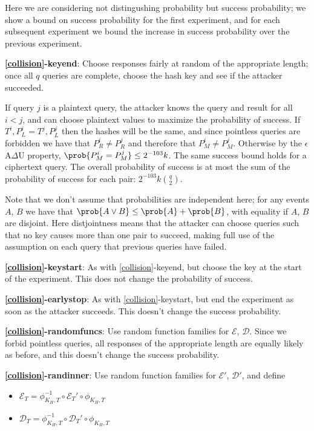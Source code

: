 \documentclass[letterpaper,luatex,11pt]{article}
\newcommand*{\xprm}[2]{\textsf{\ref*{#1}-#2}}
\newcommand*{\xprmtitle}[2]{\textbf{\xprm{#1}{#2}}}
\newcommand*{\calE}{\mathcal{E}}
\newcommand*{\calD}{\mathcal{D}}
\begin{document}
Here we are considering not distingushing probability but success probability; we
show a bound on success probability for the first experiment, and for each subsequent experiment
we bound the increase in success probability over the previous experiment.

\xprmtitle{collision}{keyend}: Choose responses fairly at random of the appropriate length;
once all $q$ queries are complete, choose the hash key and see if the attacker succeeded.

If query $j$ is a plaintext query, the attacker knows the query and result
for all $i < j$, and can choose plaintext values to maximize the probability of success.
If $T^i, P_L^i = T^j, P_L^j$ then the hashes will be the same, and since pointless
queries are forbidden we have that $P_R^i \neq P_R^j$ and therefore that
$P_M^i \neq P_M^j$. Otherwise by the $\epsilon$A$\Delta$U property,
$\prob{P_M^i = P_M^j} \leq 2^{-103}k$. The same success bound holds for a ciphertext query.
The overall probability of success
is at most the sum of the probability of success for each pair:
$2^{-103}k\binom{q}{2}$.

Note that we don't assume that probabilities are independent here;
for any events $A$, $B$ we have that $\prob{A \vee B} \leq \prob{A} + \prob{B}$, with
equality if $A$, $B$ are disjoint. Here distjointness means that the attacker can
choose queries such that no key causes more than one pair to succeed, making full use of
the assumption on each query that previous queries have failed.

\xprmtitle{collision}{keystart}: As with \xprm{collision}{keyend}, but
choose the key at the start of the experiment. This
does not change the probability of success.

\xprmtitle{collision}{earlystop}: As with \xprm{collision}{keystart}, but
end the experiment as soon as the attacker succeeds.
This doesn't change the success probability.

\xprmtitle{collision}{randomfuncs}: Use random function families for $\calE$,
$\calD$. Since we forbid pointless queries,
all responses of the appropriate length are equally likely as before,
and this doesn't change the success probability.

\xprmtitle{collision}{randinner}: Use random function families for $\calE'$, $\calD'$, and define
\begin{itemize}
    \item $\calE_T = \phi^{-1}_{K_H, T} \circ \calE_T' \circ \phi_{K_H, T}$
    \item $\calD_T = \phi^{-1}_{K_H, T} \circ \calD_T' \circ \phi_{K_H, T}$
\end{itemize}
\end{document}
